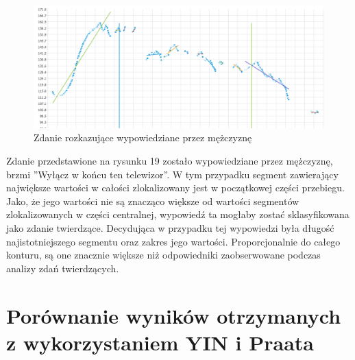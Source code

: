 \documentclass[a4paper,12 pt]{article}
\begin{document}
 \FloatBarrier
\begin{figure}[h]
\centering
\includegraphics[scale=0.7]{rozkaz_mezczyzna_telewizor.png}
\caption{Zdanie rozkazujące wypowiedziane przez mężczyznę}
\end{figure}
\FloatBarrier
Zdanie przedstawione na rysunku 19 zostało wypowiedziane przez mężczyznę, brzmi ''Wyłącz w końcu ten telewizor''.
W tym przypadku segment zawierający największe wartości w całości zlokalizowany jest w początkowej części przebiegu. Jako, że jego wartości nie są znacząco większe od wartości segmentów zlokalizowanych w części centralnej, wypowiedź ta mogłaby zostać sklasyfikowana jako zdanie twierdzące. Decydująca w przypadku tej wypowiedzi była długość najistotniejszego segmentu oraz zakres jego wartości. Proporcjonalnie do całego konturu, są one znacznie większe niż odpowiedniki zaobserwowane podczas analizy zdań twierdzących.
 
\section{Porównanie wyników otrzymanych z wykorzystaniem YIN i Praata}
\newpage
\end{document}
